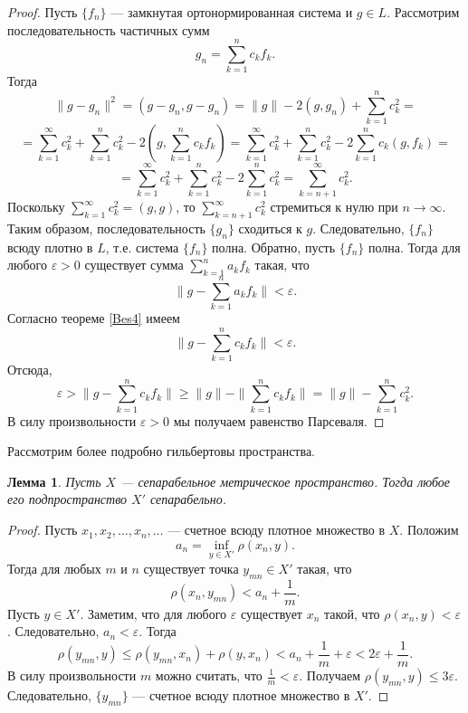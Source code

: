 \documentclass[12pt, titlepage, oneside]{amsbook}
\newtheorem{lemma}[theorem]{Лемма}
\theoremstyle{definition}
\theoremstyle{remark}
\begin{document}
\begin{proof}
Пусть $\{f_n\}$ --- замкнутая ортонормированная система и $g\in L$. Рассмотрим последовательность частичных сумм $$g_n=\sum\limits_{k=1}^n c_k f_k.$$ Тогда $$\|g-g_n\|^2=(g-g_n,g-g_n)=\|g\|-2(g,g_n)+\sum\limits_{k=1}^n c^2_k=$$ $$=\sum\limits_{k=1}^{\infty} c^2_k+\sum\limits_{k=1}^n c^2_k-2\left(g,\sum\limits_{k=1}^n c_k f_k\right)=\sum\limits_{k=1}^{\infty} c^2_k+\sum\limits_{k=1}^n c^2_k-2\sum\limits_{k=1}^n c_k(g,f_k)=$$ $$=\sum\limits_{k=1}^{\infty} c^2_k+\sum\limits_{k=1}^n c^2_k-2\sum\limits_{k=1}^n c^2_k=\sum\limits_{k=n+1}^{\infty} c^2_k.$$ Поскольку $\sum\limits_{k=1}^{\infty} c_k^2=(g,g)$, то $\sum\limits_{k=n+1}^{\infty} c^2_k$ стремиться к нулю при $n\rightarrow\infty$. Таким образом, последовательность $\{g_n\}$ сходиться к $g$. Следовательно, $\{f_n\}$ всюду плотно в $L$, т.е. система $\{f_n\}$ полна. Обратно, пусть $\{f_n\}$ полна. Тогда для любого $\varepsilon>0$ существует сумма $\sum\limits_{k=1}^{n} a_k f_k$ такая, что $$\|g-\sum\limits_{k=1}^{n} a_k f_k\|<\varepsilon.$$ Согласно теореме \ref{Bes4} имеем $$\|g-\sum\limits_{k=1}^{n} c_k f_k\|<\varepsilon.$$ Отсюда, $$\varepsilon>\|g-\sum\limits_{k=1}^{n} c_k f_k\|\geq\|g\|-\|\sum\limits_{k=1}^{n} c_k f_k\|=\|g\|-\sum\limits_{k=1}^{n} c^2_k.$$ В силу произвольности $\varepsilon>0$ мы получаем равенство Парсеваля.
\end{proof}

Рассмотрим более подробно гильбертовы пространства.

\begin{lemma}
\label{LHil1}
Пусть $X$ --- сепарабельное метрическое пространство. Тогда любое его подпространство $X'$ сепарабельно.
\end{lemma}

\begin{proof}
Пусть $x_1,x_2,\ldots,x_n,\ldots$ --- счетное всюду плотное множество в $X$. Положим $$a_n=\inf\limits_{y\in X'}\rho(x_n,y).$$ Тогда для любых $m$ и $n$ существует точка $y_{mn}\in X'$ такая, что $$\rho(x_n,y_{mn})<a_n+\frac{1}{m}.$$ Пусть $y\in X'$. Заметим, что для любого $\varepsilon$ существует $x_n$ такой, что $\rho(x_n,y)<\varepsilon$. Следовательно, $a_n<\varepsilon$. Тогда $$\rho(y_{mn},y)\leq\rho(y_{mn},x_n)+\rho(y,x_n)<a_n+\frac{1}{m}+\varepsilon<2\varepsilon+\frac{1}{m}.$$ В силу произвольности $m$ можно считать, что $\frac{1}{m}<\varepsilon$. Получаем $\rho(y_{mn},y)\leq3\varepsilon$. Следовательно, $\{y_{mn}\}$ --- счетное всюду плотное множество в $X'$.
\end{proof}
\end{document}
